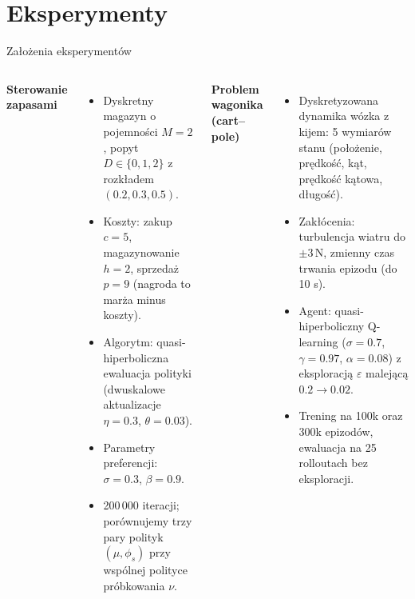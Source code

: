 \section{Eksperymenty}
\begin{frame}{Założenia eksperymentów}
  \begin{columns}[T]
    \textbf{Sterowanie zapasami}\smallskip
    \begin{itemize}
      \item Dyskretny magazyn o pojemności $M=2$, popyt $D\in\{0,1,2\}$ z rozkładem $(0.2,0.3,0.5)$.
      \item Koszty: zakup $c=5$, magazynowanie $h=2$, sprzedaż $p=9$ (nagroda to marża minus koszty).
      \item Algorytm: quasi-hiperboliczna ewaluacja polityki (dwuskalowe aktualizacje $\eta=0.3$, $\theta=0.03$).
      \item Parametry preferencji: $\sigma=0.3$, $\beta=0.9$.
      \item 200\,000 iteracji; porównujemy trzy pary polityk $(\mu,\phi_s)$ przy wspólnej polityce próbkowania $\nu$.
    \end{itemize}

    \textbf{Problem wagonika (cart--pole)}\smallskip
    \begin{itemize}
      \item Dyskretyzowana dynamika wózka z kijem: 5 wymiarów stanu (położenie, prędkość, kąt, prędkość kątowa, długość).
      \item Zakłócenia: turbulencja wiatru do $\pm3\,\mathrm{N}$, zmienny czas trwania epizodu (do 10 s).
      \item Agent: quasi-hiperboliczny Q-learning ($\sigma=0.7$, $\gamma=0.97$, $\alpha=0.08$) z eksploracją $\varepsilon$ malejącą $0.2\to0.02$.
      \item Trening na 100k oraz 300k epizodów, ewaluacja na 25 rolloutach bez eksploracji.
    \end{itemize}
  \end{columns}
\end{frame}


